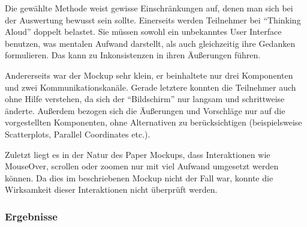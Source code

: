 \documentclass[
	headsepline,
	footsepline,
	fontsize=12pt,
	bibliography=totoc
]{scrbook}
\begin{document}
Die gewählte Methode weist gewisse Einschränkungen auf, denen man sich bei der Auswertung bewusst sein sollte. Einerseits werden Teilnehmer bei \enquote{Thinking Aloud} doppelt belastet. Sie müssen sowohl ein unbekanntes User Interface benutzen, was mentalen Aufwand darstellt, als auch gleichzeitig ihre Gedanken formulieren. Das kann zu Inkonsistenzen in ihren Äußerungen führen.

Andererseits war der Mockup sehr klein, er beinhaltete nur drei Komponenten und zwei Kommunikationskanäle. Gerade letztere konnten die Teilnehmer auch ohne Hilfe verstehen, da sich der \enquote{Bildschirm} nur langsam und schrittweise änderte. Außerdem bezogen sich die Äußerungen und Vorschläge nur auf die vorgestellten Komponenten, ohne Alternativen zu berücksichtigen (beispielsweise Scatterplots, Parallel Coordinates etc.).

Zuletzt liegt es in der Natur des Paper Mockups, dass Interaktionen wie MouseOver, scrollen oder zoomen nur mit viel Aufwand umgesetzt werden können. Da dies im beschriebenen Mockup nicht der Fall war, konnte die Wirksamkeit dieser Interaktionen nicht überprüft werden.

\subsubsection{Ergebnisse}


\end{document}
